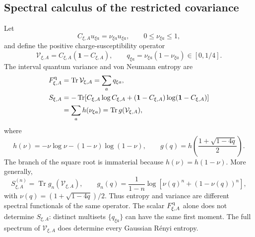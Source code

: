 \documentclass[aps,prx,onecolumn,nofootinbib,superscriptaddress,longbibliography]{revtex4-2}
\newcommand{\Id}{\mathbf{1}}
\newcommand{\qTr}{\operatorname{Tr}}
\begin{document}
\subsection{Spectral calculus of the restricted covariance}

Let
\begin{equation}
 C_{\xi,A}u_{\xi a}=\nu_{\xi a}u_{\xi a},
 \qquad 0\leq \nu_{\xi a}\leq1,
\end{equation}
and define the positive charge-susceptibility operator
\begin{equation}
 \mathcal V_{\xi,A}
 =C_{\xi,A}(\Id-C_{\xi,A}),
 \qquad
 q_{\xi a}=\nu_{\xi a}(1-\nu_{\xi a})\in[0,1/4].
 \label{eq:charge-susceptibility-operator}
\end{equation}
The interval quantum variance and von Neumann entropy are
\begin{align}
 F_{\xi,A}^{\rm q}
 &=\qTr\mathcal V_{\xi,A}
   =\sum_aq_{\xi a},\label{eq:variance-from-V}\\
 S_{\xi,A}
 &=-\qTr\!\left[
 C_{\xi,A}\log C_{\xi,A}
 +(\Id-C_{\xi,A})\log(\Id-C_{\xi,A})\right]\nonumber\\
 &=\sum_a h(\nu_{\xi a})
   =\qTr g(\mathcal V_{\xi,A}),\label{eq:entropy-from-V}
\end{align}
where
\begin{equation}
 h(\nu)=-\nu\log\nu-(1-\nu)\log(1-\nu),
 \qquad
 g(q)=h\!\left(\frac{1+\sqrt{1-4q}}{2}\right).
 \label{eq:entropy-kernel-q}
\end{equation}
The branch of the square root is immaterial because $h(\nu)=h(1-\nu)$.  More generally,
\begin{equation}
 S_{\xi,A}^{(n)}
 =\qTr g_n(\mathcal V_{\xi,A}),\qquad
 g_n(q)=\frac{1}{1-n}
 \log\!\left[\nu(q)^n+(1-\nu(q))^n\right],
 \label{eq:renyi-from-V}
\end{equation}
with $\nu(q)=(1+\sqrt{1-4q})/2$.  Thus entropy and variance are different spectral
functionals of the same operator.  The scalar $F_{\xi,A}^{\rm q}$ alone does not determine
$S_{\xi,A}$: distinct multisets $\{q_{\xi a}\}$ can have the same first moment.  The full
spectrum of $\mathcal V_{\xi,A}$ does determine every Gaussian R\'enyi entropy.
\end{document}
